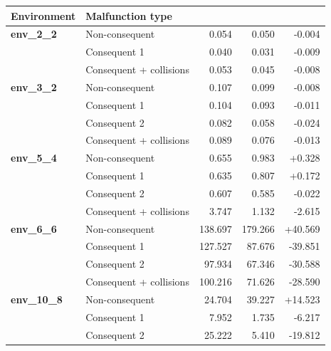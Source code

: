 \documentclass[runningheads]{llncs}
\begin{document}
\begin{table}[htbp]
	\centering
	\footnotesize
	\setlength{\tabcolsep}{4pt}
	\renewcommand{\arraystretch}{0.9}
	
	\begin{tabular}{@{}llrrr@{}}
		\toprule
		\textbf{Environment} &
		\textbf{Malfunction type} &
		\makecell[r]{\textbf{base}} &
		\makecell[r]{\textbf{~~time prioritization}} &
		\makecell[r]{\textbf{$\Delta T_{\mathrm{res}}$}} \\
		\midrule

		\textbf{env\_2\_2}
		& Non-consequent & 0.054 & 0.050 & -0.004 \\
		& Consequent 1 & 0.040 & 0.031 & -0.009 \\
		& Consequent + collisions & 0.053 & 0.045 & -0.008 \\

		\midrule
		
		\textbf{env\_3\_2}
		& Non-consequent & 0.107 & 0.099 & -0.008 \\
		& Consequent 1 & 0.104 & 0.093 & -0.011 \\
		& Consequent 2 & 0.082 & 0.058 & -0.024 \\
		& Consequent + collisions & 0.089 & 0.076 & -0.013 \\

		\midrule

		\textbf{env\_5\_4}
		& Non-consequent & 0.655 & 0.983 & +0.328 \\
		& Consequent 1 & 0.635 & 0.807 & +0.172 \\
		& Consequent 2 & 0.607 & 0.585 & -0.022 \\
		& Consequent + collisions & 3.747 & 1.132 & -2.615 \\

		\midrule

		\textbf{env\_6\_6}
		& Non-consequent & 138.697 & 179.266 & +40.569 \\
		& Consequent 1 & 127.527 & 87.676 & -39.851 \\
		& Consequent 2 & 97.934 & 67.346 & -30.588 \\
		& Consequent + collisions & 100.216 & 71.626 & -28.590 \\

		\midrule

		\textbf{env\_10\_8}
		& Non-consequent & 24.704 & 39.227 & +14.523 \\
		& Consequent 1 & 7.952 & 1.735 & -6.217 \\
		& Consequent 2 & 25.222 & 5.410 & -19.812 \\


\end{tabular}
\end{table}
\end{document}
